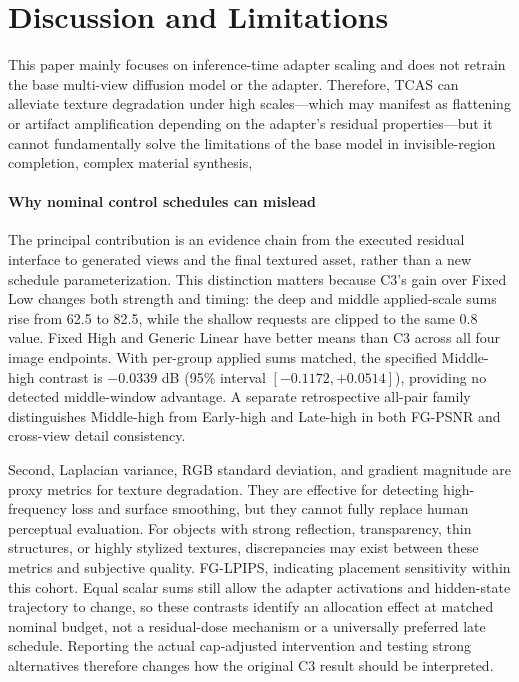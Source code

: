 \documentclass[times,twocolumn,final]{elsarticle}
\providecommand{\DIFadd}[1]{{\protect\color{blue} \sf #1}} %
\providecommand{\DIFdel}[1]{{\protect\color{red} \scriptsize #1}} %
\providecommand{\DIFaddbegin}{} %
\providecommand{\DIFaddend}{} %
\providecommand{\DIFdelbegin}{} %
\providecommand{\DIFdelend}{} %
\begin{document}
\section{Discussion and Limitations}
\DIFaddend \label{sec:limitations}

\DIFdelbegin \DIFdel{This paper mainly focuses on inference-time adapter scaling and does not retrain the base multi-view diffusion model or the adapter. Therefore, TCAS can alleviate texture degradation under high scales---which may manifest as flattening or artifact amplification depending on the adapter's residual properties---but it cannot fundamentally solve the limitations of the base model in invisible-region completion, complex material synthesis, }\DIFdelend \DIFaddbegin \paragraph{Why nominal control schedules can mislead}
\DIFadd{The principal contribution is an evidence chain from the executed residual interface to generated views and the final textured asset, rather than a new schedule parameterization. This distinction matters because C3's gain over Fixed Low changes both strength and timing: the deep and middle applied-scale sums rise from 62.5 to 82.5, while the shallow requests are clipped to the same 0.8 value. Fixed High and Generic Linear have better means than C3 across all four image endpoints. With per-group applied sums matched, the specified Middle-high contrast is $-0.0339$ dB (95\% interval $[-0.1172,+0.0514]$), providing no detected middle-window advantage. A separate retrospective all-pair family distinguishes Middle-high from Early-high and Late-high in both FG-PSNR }\DIFaddend and \DIFdelbegin \DIFdel{cross-view detail consistency. }%

\DIFdel{Second, Laplacian variance, RGB standard deviation, and gradient magnitude are proxy metrics for texture degradation. They are effective for detecting high-frequency loss and surface smoothing, but they cannot fully replace human perceptual evaluation.
For objects with strong reflection, transparency, thin structures, or highly stylized textures, discrepancies may exist between these metrics and subjective quality.
}\DIFdelend \DIFaddbegin \DIFadd{FG-LPIPS, indicating placement sensitivity within this cohort. Equal scalar sums still allow the adapter activations and hidden-state trajectory to change, so these contrasts identify an allocation effect at matched nominal budget, not a residual-dose mechanism or a universally preferred late schedule. Reporting the actual cap-adjusted intervention and testing strong alternatives therefore changes how the original C3 result should be interpreted.
}\DIFaddend
\end{document}
